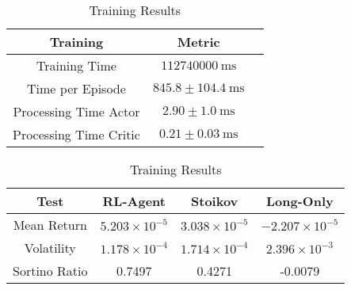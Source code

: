 \begin{table}
    \centering
    \centering
    \small

    \begin{tabular}{|c|c|c|}
        \hline
        \textbf{Training}      & \textbf{Metric}                       \\
        \hline
        Training Time          & $\SI{112740000}{\milli\second}$       \\
        Time per Episode       & $845.8 \pm \SI{104.4}{\milli\second}$ \\
        Processing Time Actor  & $2.90 \pm \SI{1.0}{\milli\second}$    \\
        Processing Time Critic & $0.21 \pm \SI{0.03}{\milli\second}$   \\
        \hline
    \end{tabular}
    \caption{Test Results}
    \label{tab:test-results}
    \centering
    \vspace{0.5cm}
    \small

    \begin{tabular}{|c|c|c|c|}
        \hline
        \textbf{Test} & \textbf{RL-Agent}      & \textbf{Stoikov}       & \textbf{Long-Only}      \\
        \hline
        Mean Return   & $5.203 \times 10^{-5}$ & $3.038 \times 10^{-5}$ & $-2.207 \times 10^{-5}$ \\
        Volatility    & $1.178 \times 10^{-4}$ & $1.714 \times 10^{-4}$ & $2.396 \times 10^{-3}$  \\
        Sortino Ratio & 0.7497                 & 0.4271                 & -0.0079                 \\
        \hline
    \end{tabular}
    \caption{Training Results}
    \label{tab:training-results}
\end{table}

